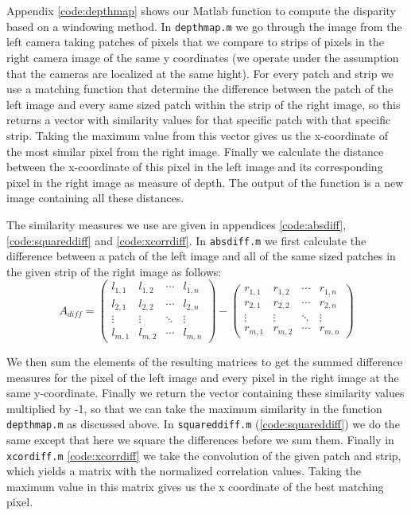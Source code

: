\documentclass{article}
\begin{document}
\section{}
Appendix \ref{code:depthmap} shows our Matlab function to compute the disparity based on a windowing method. In \texttt{depthmap.m} we go through the image from the left camera taking patches of pixels that we compare to strips of pixels in the right camera image of the same y coordinates (we operate under the assumption that the cameras are localized at the same hight). For every patch and strip we use a matching function that determine the difference between the patch of the left image and every same sized patch within the strip of the right image, so this returns a vector with similarity values for that specific patch with that specific strip. Taking the maximum value from this vector gives us the x-coordinate of the most similar pixel from the right image. Finally we calculate the distance between the x-coordinate of this pixel in the left image and its corresponding pixel in the right image as measure of depth. The output of the function is a new image containing all these distances.

The similarity measures we use are given in appendices \ref{code:absdiff}, \ref{code:squareddiff} and \ref{code:xcorrdiff}. In \texttt{absdiff.m} we first calculate the difference between a patch of the left image and all of the same sized patches in the given strip of the right image as follows:
\begin{equation}
A_{diff} = 
 \begin{pmatrix}
  l_{1,1} & l_{1,2} & \cdots & l_{1,n} \\
  l_{2,1} & l_{2,2} & \cdots & l_{2,n} \\
  \vdots  & \vdots  & \ddots & \vdots  \\
  l_{m,1} & l_{m,2} & \cdots & l_{m,n} 
 \end{pmatrix}
-
 \begin{pmatrix}
  r_{1,1} & r_{1,2} & \cdots & r_{1,n} \\
  r_{2,1} & r_{2,2} & \cdots & r_{2,n} \\
  \vdots  & \vdots  & \ddots & \vdots  \\
  r_{m,1} & r_{m,2} & \cdots & r_{m,n} 
 \end{pmatrix} 
\end{equation}

We then sum the elements of the resulting matrices to get the summed difference measures for the pixel of the left image and every pixel in the right image at the same y-coordinate. Finally we return the vector containing these similarity values multiplied by -1, so that we can take the maximum similarity in the function \texttt{depthmap.m} as discussed above. In \texttt{squareddiff.m} (\ref{code:squareddiff}) we do the same except that here we square the differences before we sum them.
Finally in \texttt{xcordiff.m} \ref{code:xcorrdiff} we take the convolution of the given patch and strip, which yields a matrix with the normalized correlation values. Taking the maximum value in this matrix gives us the x coordinate of the best matching pixel.
\end{document}
